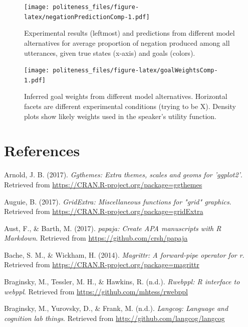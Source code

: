 \documentclass[english,floatsintext,man]{apa6}
\theoremstyle{definition}
\theoremstyle{definition}
\theoremstyle{definition}
\theoremstyle{remark}
\begin{document}
\begin{figure}
\centering
\texttt{[image: politeness\_files/figure-latex/negationPredictionComp-1.pdf]}
\caption{\label{fig:negationPredictionComp}Experimental results (leftmost)
and predictions from different model alternatives for average proportion
of negation produced among all utterances, given true states (x-axis)
and goals (colors).}
\end{figure}

\begin{figure}
\centering
\texttt{[image: politeness\_files/figure-latex/goalWeightsComp-1.pdf]}
\caption{\label{fig:goalWeightsComp}Inferred goal weights from different
model alternatives. Horizontal facets are different experimental
conditions (trying to be X). Density plots show likely weights used in
the speaker's utility function.}
\end{figure}

\newpage

\hypertarget{references}{%
\section{References}\label{references}}

\setlength{\parindent}{-0.5in}\setlength{\leftskip}{0.5in}

\hypertarget{refs}{}
\leavevmode\hypertarget{ref-R-ggthemes}{}%
Arnold, J. B. (2017). \emph{Ggthemes: Extra themes, scales and geoms for
'ggplot2'}. Retrieved from
\url{https://CRAN.R-project.org/package=ggthemes}

\leavevmode\hypertarget{ref-R-gridExtra}{}%
Auguie, B. (2017). \emph{GridExtra: Miscellaneous functions for "grid"
graphics}. Retrieved from
\url{https://CRAN.R-project.org/package=gridExtra}

\leavevmode\hypertarget{ref-R-papaja}{}%
Aust, F., \& Barth, M. (2017). \emph{papaja: Create APA manuscripts with
R Markdown}. Retrieved from \url{https://github.com/crsh/papaja}

\leavevmode\hypertarget{ref-R-magrittr}{}%
Bache, S. M., \& Wickham, H. (2014). \emph{Magrittr: A forward-pipe
operator for r}. Retrieved from
\url{https://CRAN.R-project.org/package=magrittr}

\leavevmode\hypertarget{ref-R-rwebppl}{}%
Braginsky, M., Tessler, M. H., \& Hawkins, R. (n.d.). \emph{Rwebppl: R
interface to webppl}. Retrieved from
\url{https://github.com/mhtess/rwebppl}

\leavevmode\hypertarget{ref-R-langcog}{}%
Braginsky, M., Yurovsky, D., \& Frank, M. (n.d.). \emph{Langcog:
Language and cognition lab things}. Retrieved from
\url{http://github.com/langcog/langcog}
\end{document}
